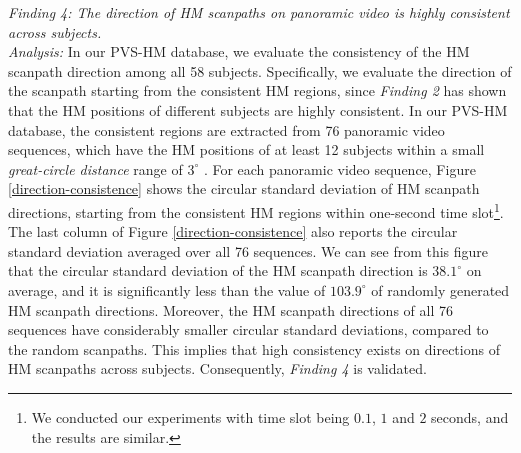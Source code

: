 \documentclass[10pt,journal,compsoc]{IEEEtran}
\begin{document}
\emph{Finding 4: The direction of HM scanpaths on panoramic video is highly consistent across subjects.}
\\ \textit{Analysis:} In  our PVS-HM database, we evaluate the consistency of the HM scanpath direction among all 58 subjects.
Specifically, we evaluate the direction of the scanpath starting from the consistent HM regions, since \textit{Finding 2} has shown that the HM positions of different subjects are highly consistent. In our PVS-HM database, the consistent regions are extracted from 76 panoramic video sequences, which have the HM positions of at least 12 subjects within a small \textit{great-circle distance} range of $3^{\circ}$ \cite{matin1974saccadic}. For each panoramic video sequence, Figure \ref{direction-consistence} shows the circular standard deviation \cite{frederic2010mean} of HM scanpath directions, starting from the consistent HM regions within one-second time slot\footnote{We conducted our experiments with time slot being $0.1$, $1$ and $2$ seconds, and the results are similar.}. The last column of Figure \ref{direction-consistence} also reports the circular standard deviation averaged over all 76 sequences.
We can see from this figure that the circular standard deviation of the HM scanpath direction is $38.1^{\circ}$ on average, and it is significantly less than the value of $103.9^{\circ}$ of randomly generated HM scanpath directions. Moreover, the HM scanpath directions of all 76 sequences have considerably smaller circular standard deviations, compared to the random scanpaths.
This implies that high consistency exists on directions of HM scanpaths across subjects.
Consequently, \textit{Finding 4} is validated.
\end{document}
